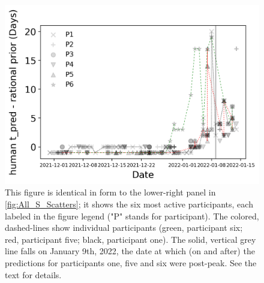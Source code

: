 \begin{figure}
    \centering
    \includegraphics[width=\linewidth]{Figures/Single_Ss_Date_Summary.png}
    \caption{This figure is identical in form to the lower-right panel in \ref{fig:All_S_Scatters}; it shows the six most active participants, each labeled in the figure legend ("P" stands for participant).  The colored, dashed-lines show individual participants (green, participant six; red, participant five; black, participant one). The solid, vertical grey line falls on January 9th, 2022, the date at which (on and after) the predictions for participants one, five and six were post-peak.  See the text for details.}
    \label{fig:Single_Ss_Summary_2}
\end{figure}
